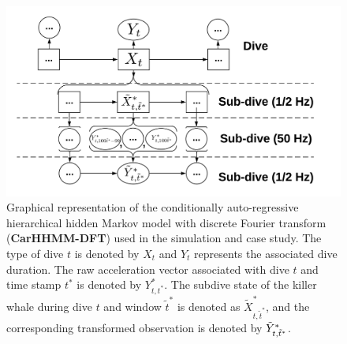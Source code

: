 \begin{figure}[ht]
	\centering
	\includegraphics[width=5in]{../Plots/CarHHMM-DFT.png}
	\caption{Graphical representation of the conditionally auto-regressive hierarchical hidden Markov model with discrete Fourier transform (\textbf{CarHHMM-DFT}) used in the simulation and case study. The type of dive $t$ is denoted by $X_t$ and $Y_t$ represents the associated dive duration. The raw acceleration vector associated with dive $t$ and time stamp $t^*$ is denoted by $Y^*_{t,t^*}$. The subdive state of the killer whale during dive $t$ and window $\tilde t^*$ is denoted as $\tilde X^*_{t,\tilde t^*}$, and the corresponding transformed observation is denoted by $\tilde{Y}^*_{t,\tilde t^*}$.}
	\label{fig:CarHHMM-DFT}
\end{figure}

